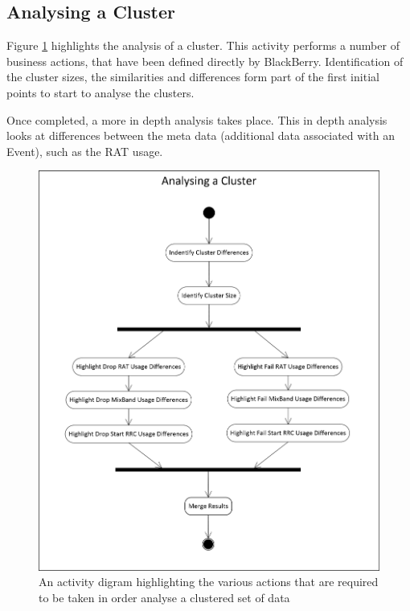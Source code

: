 \subsection{Analysing a Cluster}
Figure \ref{fig:analyseclusteractivity} highlights the analysis of a cluster. 
This activity performs a number of business actions, that have been defined 
directly by BlackBerry. Identification of the cluster sizes, the similarities 
and differences form part of the first initial points to start to analyse the 
clusters.

Once completed, a more in depth analysis takes place. This in depth analysis 
looks at differences between the meta data (additional data associated with an 
Event), such as the RAT usage.

\begin{figure}[H]
  \centering
    \includegraphics[scale=0.9]{chapter7/activity/analyse_cluster.png}
    \caption[Analysing a cluster activity diagram]
            {An activity digram highlighting the various actions that are 
             required to be taken in order analyse a clustered set of data}
    \label{fig:analyseclusteractivity}
\end{figure}
